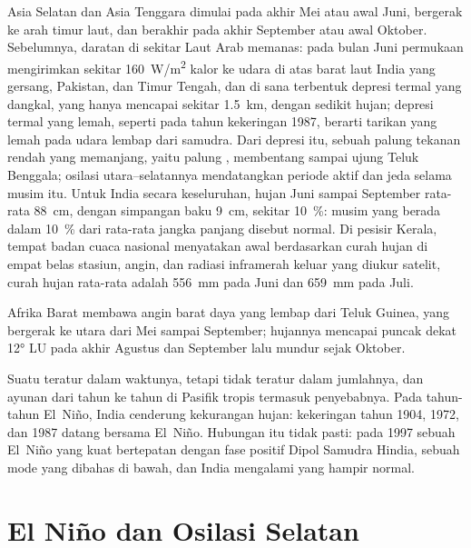  Asia Selatan dan Asia Tenggara dimulai pada akhir Mei atau awal Juni, bergerak
ke arah timur laut, dan berakhir pada akhir September atau awal Oktober. Sebelumnya, daratan di sekitar
Laut Arab memanas: pada bulan Juni permukaan mengirimkan sekitar \qty{160}{W/m^2} kalor ke udara di atas
barat laut India yang gersang, Pakistan, dan Timur Tengah, dan di sana terbentuk depresi termal yang dangkal,
yang hanya mencapai sekitar \qty{1.5}{km}, dengan sedikit hujan; depresi termal yang lemah, seperti pada tahun kekeringan
1987, berarti tarikan yang lemah pada udara lembap dari samudra. Dari depresi itu, sebuah palung tekanan rendah yang memanjang, yaitu palung
, membentang sampai ujung Teluk Benggala; osilasi utara--selatannya mendatangkan periode
aktif dan jeda selama musim itu. Untuk India secara keseluruhan, hujan Juni sampai September rata-rata
\qty{88}{cm}, dengan simpangan baku \qty{9}{cm}, sekitar \qty{10}{\percent}: musim yang berada dalam
\qty{10}{\percent} dari rata-rata jangka panjang disebut normal. Di pesisir Kerala, tempat
badan cuaca nasional menyatakan awal  berdasarkan curah hujan di empat belas stasiun,
angin, dan radiasi inframerah keluar yang diukur satelit, curah hujan rata-rata adalah
\qty{556}{mm} pada Juni dan \qty{659}{mm} pada Juli.

 Afrika Barat membawa angin barat daya yang lembap dari Teluk Guinea, yang bergerak
ke utara dari Mei sampai September; hujannya mencapai puncak dekat \ang{12} LU pada akhir Agustus dan September lalu
mundur sejak Oktober.

Suatu  teratur dalam waktunya, tetapi tidak teratur dalam jumlahnya, dan ayunan dari tahun ke tahun di
Pasifik tropis termasuk penyebabnya. Pada tahun-tahun El~Niño, India cenderung kekurangan hujan:
kekeringan tahun 1904, 1972, dan 1987 datang bersama El~Niño. Hubungan itu tidak pasti: pada 1997 sebuah
El~Niño yang kuat bertepatan dengan fase positif Dipol Samudra Hindia, sebuah mode yang dibahas di bawah, dan India
mengalami  yang hampir normal.

\section{El Niño dan Osilasi Selatan}\label{sec:b2:climate-variability:enso}


